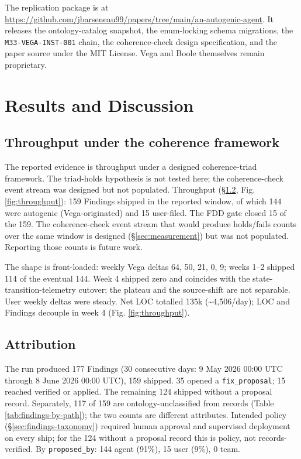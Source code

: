 \documentclass[conference,10pt]{IEEEtran}
\begin{document}
The replication package is at \url{https://github.com/jbarseneau99/papers/tree/main/an-autogenic-agent}. It releases the ontology-catalog snapshot, the enum-locking schema migrations, the \texttt{M33-VEGA-INST-001} chain, the coherence-check design specification, and the paper source under the MIT License. Vega and Boole themselves remain proprietary.

\section{Results and Discussion}\label{sec:results}

\subsection{Throughput under the coherence framework}\label{sec:res-coherence}

The reported evidence is throughput under a designed coherence-triad
framework. The triad-holds hypothesis is not tested here; the
coherence-check event stream was designed but not populated. Throughput
(§\ref{sec:res-attribution}, Fig. \ref{fig:throughput}): 159 Findings shipped in the
reported window, of which 144 were autogenic (Vega-originated) and 15
user-filed. The FDD gate closed 15 of the 159. The coherence-check event stream that would produce
holds/fails counts over the same window is designed
(§\ref{sec:measurement}) but was not populated. Reporting
those counts is future work.

The shape is front-loaded: weekly Vega deltas 64, 50, 21, 0, 9; weeks
1--2 shipped 114 of the eventual 144. Week 4 shipped zero and
coincides with the state-transition-telemetry cutover; the plateau and
the source-shift are not separable. User weekly deltas were steady.
Net LOC totalled 135k (\textasciitilde4,506/day); LOC and Findings decouple in week
4 (Fig. \ref{fig:throughput}).

\subsection{Attribution}\label{sec:res-attribution}

The run produced 177 Findings (30 consecutive days: 9 May 2026
00:00 UTC through 8 June 2026 00:00 UTC), 159
shipped. 35 opened a \texttt{fix\_proposal}; 15 reached verified or applied.
The remaining 124 shipped without a proposal record. Separately, 117
of 159 are ontology-unclassified from records (Table
\ref{tab:findings-by-path}); the two counts are different
attributes. Intended policy (§\ref{sec:findings-taxonomy})
required human approval and supervised deployment on every ship; for
the 124 without a proposal record this is policy, not records-verified.
By \texttt{proposed\_by}: 144 agent (91\%), 15 user (9\%), 0 team.
\end{document}
